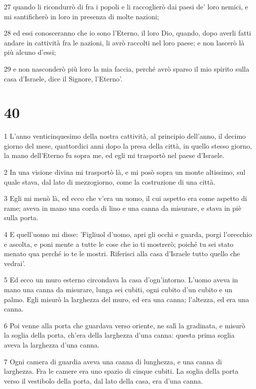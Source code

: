 \par 27 quando li ricondurrò di fra i popoli e li raccoglierò dai paesi de' loro nemici, e mi santificherò in loro in presenza di molte nazioni;
\par 28 ed essi conosceranno che io sono l'Eterno, il loro Dio, quando, dopo averli fatti andare in cattività fra le nazioni, li avrò raccolti nel loro paese; e non lascerò là più alcuno d'essi;
\par 29 e non nasconderò più loro la mia faccia, perché avrò sparso il mio spirito sulla casa d'Israele, dice il Signore, l'Eterno'.

\chapter{40}

\par 1 L'anno venticinquesimo della nostra cattività, al principio dell'anno, il decimo giorno del mese, quattordici anni dopo la presa della città, in quello stesso giorno, la mano dell'Eterno fu sopra me, ed egli mi trasportò nel paese d'Israele.
\par 2 In una visione divina mi trasportò là, e mi posò sopra un monte altissimo, sul quale stava, dal lato di mezzogiorno, come la costruzione di una città.
\par 3 Egli mi menò là, ed ecco che v'era un uomo, il cui aspetto era come aspetto di rame; aveva in mano una corda di lino e una canna da misurare, e stava in piè sulla porta.
\par 4 E quell'uomo mi disse: 'Figliuol d'uomo, apri gli occhi e guarda, porgi l'orecchio e ascolta, e poni mente a tutte le cose che io ti mostrerò; poiché tu sei stato menato qua perché io te le mostri. Riferisci alla casa d'Israele tutto quello che vedrai'.
\par 5 Ed ecco un muro esterno circondava la casa d'ogn'intorno. L'uomo aveva in mano una canna da misurare, lunga sei cubiti, ogni cubito d'un cubito e un palmo. Egli misurò la larghezza del muro, ed era una canna; l'altezza, ed era una canna.
\par 6 Poi venne alla porta che guardava verso oriente, ne salì la gradinata, e misurò la soglia della porta, ch'era della larghezza d'una canna: questa prima soglia aveva la larghezza d'una canna.
\par 7 Ogni camera di guardia aveva una canna di lunghezza, e una canna di larghezza. Fra le camere era uno spazio di cinque cubiti. La soglia della porta verso il vestibolo della porta, dal lato della casa, era d'una canna.
